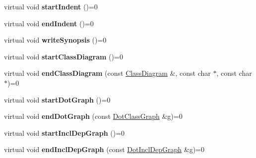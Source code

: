 \begin{DoxyCompactItemize}
\item 
\hypertarget{class_output_generator_a4091ec8981ffe99e19dc2e86a46abaed}{virtual void {\bfseries start\-Indent} ()=0}\label{class_output_generator_a4091ec8981ffe99e19dc2e86a46abaed}

\item 
\hypertarget{class_output_generator_a43b0d8886e5c8572921638b2e51abd85}{virtual void {\bfseries end\-Indent} ()=0}\label{class_output_generator_a43b0d8886e5c8572921638b2e51abd85}

\item 
\hypertarget{class_output_generator_af075d4cee3182ebf95b10b8276f09d87}{virtual void {\bfseries write\-Synopsis} ()=0}\label{class_output_generator_af075d4cee3182ebf95b10b8276f09d87}

\item 
\hypertarget{class_output_generator_a24874d2a82168b3710c2825d6f59b2b2}{virtual void {\bfseries start\-Class\-Diagram} ()=0}\label{class_output_generator_a24874d2a82168b3710c2825d6f59b2b2}

\item 
\hypertarget{class_output_generator_a0e4e5cafa63be108c71527b936b20ade}{virtual void {\bfseries end\-Class\-Diagram} (const \hyperlink{class_class_diagram}{Class\-Diagram} \&, const char $\ast$, const char $\ast$)=0}\label{class_output_generator_a0e4e5cafa63be108c71527b936b20ade}

\item 
\hypertarget{class_output_generator_a02593f58db2323eda785e1c9b3900a98}{virtual void {\bfseries start\-Dot\-Graph} ()=0}\label{class_output_generator_a02593f58db2323eda785e1c9b3900a98}

\item 
\hypertarget{class_output_generator_aa5bf95cee606028b354033bbc0b8bc3a}{virtual void {\bfseries end\-Dot\-Graph} (const \hyperlink{class_dot_class_graph}{Dot\-Class\-Graph} \&g)=0}\label{class_output_generator_aa5bf95cee606028b354033bbc0b8bc3a}

\item 
\hypertarget{class_output_generator_aab939d081d0f4a60a01ef99ee62d2324}{virtual void {\bfseries start\-Incl\-Dep\-Graph} ()=0}\label{class_output_generator_aab939d081d0f4a60a01ef99ee62d2324}

\item 
\hypertarget{class_output_generator_aca5c1dbac82d1b66d5fbfebcb1711632}{virtual void {\bfseries end\-Incl\-Dep\-Graph} (const \hyperlink{class_dot_incl_dep_graph}{Dot\-Incl\-Dep\-Graph} \&g)=0}\label{class_output_generator_aca5c1dbac82d1b66d5fbfebcb1711632}


\end{DoxyCompactItemize}
